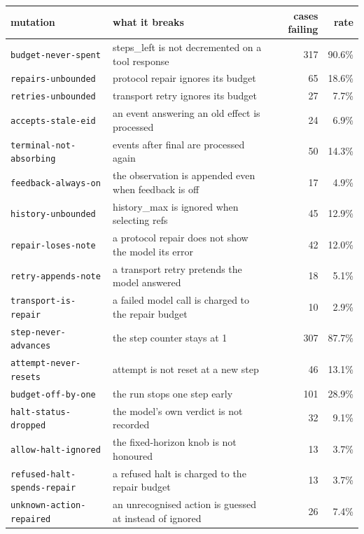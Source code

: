 \begin{tabular}{llrr}
\toprule
mutation & what it breaks & cases failing & rate \\
\midrule
\texttt{budget-never-spent} & steps\_left is not decremented on a tool response & 317 & 90.6\% \\
\texttt{repairs-unbounded} & protocol repair ignores its budget & 65 & 18.6\% \\
\texttt{retries-unbounded} & transport retry ignores its budget & 27 & 7.7\% \\
\texttt{accepts-stale-eid} & an event answering an old effect is processed & 24 & 6.9\% \\
\texttt{terminal-not-absorbing} & events after final are processed again & 50 & 14.3\% \\
\texttt{feedback-always-on} & the observation is appended even when feedback is off & 17 & 4.9\% \\
\texttt{history-unbounded} & history\_max is ignored when selecting refs & 45 & 12.9\% \\
\texttt{repair-loses-note} & a protocol repair does not show the model its error & 42 & 12.0\% \\
\texttt{retry-appends-note} & a transport retry pretends the model answered & 18 & 5.1\% \\
\texttt{transport-is-repair} & a failed model call is charged to the repair budget & 10 & 2.9\% \\
\texttt{step-never-advances} & the step counter stays at 1 & 307 & 87.7\% \\
\texttt{attempt-never-resets} & attempt is not reset at a new step & 46 & 13.1\% \\
\texttt{budget-off-by-one} & the run stops one step early & 101 & 28.9\% \\
\texttt{halt-status-dropped} & the model's own verdict is not recorded & 32 & 9.1\% \\
\texttt{allow-halt-ignored} & the fixed-horizon knob is not honoured & 13 & 3.7\% \\
\texttt{refused-halt-spends-repair} & a refused halt is charged to the repair budget & 13 & 3.7\% \\
\texttt{unknown-action-repaired} & an unrecognised action is guessed at instead of ignored & 26 & 7.4\% \\
\bottomrule
\end{tabular}
